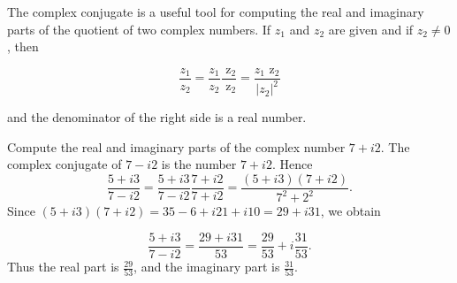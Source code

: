 The complex conjugate is a useful tool for computing the real and imaginary parts of the
quotient of two complex numbers. If $z_{1}$ and $z_{2}$ are given and if $z_{2} \neq 0$,
then

$$
\frac{z_1}{z_2} = \frac{z_1}{z_2} \frac{\mbox{ \={z}}_2}{\mbox{ \={z}}_2}
 = \frac{z_{1}\mbox{ \={z}}_2}{| z_{2} |^2}
$$

\noindent and the denominator of the right side is a real number.


\begin{example} 
Compute the real and imaginary parts of the complex number $7 + i2$. The complex conjugate 
of $7 - i2$ is the number $7 + i2$. Hence
$$
\frac{5 + i3}{7 - i2} = \frac{ 5 + i3}{ 7 - i2} \frac{7 + i2}{7+i2} = \frac{(5 + i3)(7 + i2)}{7^{2} +2^{2}}.
$$
\noindent Since $(5 + i3)(7 + i2) = 35 - 6 + i21 + i 10 = 29 + i31$, we obtain

$$
\frac{5 + i3}{7 - i2} = \frac{ 29 + i31}{ 53} = \frac{29}{53} + i \frac{31}{53}. 
$$
\noindent Thus the real part is $\frac{29}{53}$, and the imaginary part is $\frac{31}{53}$.
\end{example}


